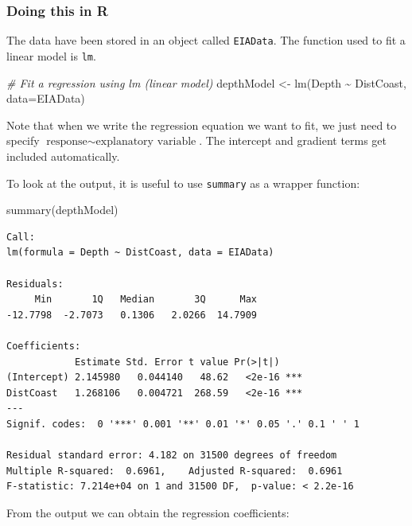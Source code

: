 \documentclass[
  oneside]{krantz}
\newenvironment{Shaded}{\begin{snugshade}}{\end{snugshade}}
\newcommand{\AttributeTok}[1]{\textcolor[rgb]{0.77,0.63,0.00}{#1}}
\newcommand{\CommentTok}[1]{\textcolor[rgb]{0.56,0.35,0.01}{\textit{#1}}}
\newcommand{\FunctionTok}[1]{\textcolor[rgb]{0.00,0.00,0.00}{#1}}
\newcommand{\NormalTok}[1]{#1}
\newcommand{\OtherTok}[1]{\textcolor[rgb]{0.56,0.35,0.01}{#1}}
\newcommand{\SpecialCharTok}[1]{\textcolor[rgb]{0.00,0.00,0.00}{#1}}
\begin{document}
\hypertarget{doing-this-in-r-24}{%
\subsubsection{Doing this in R}\label{doing-this-in-r-24}}

The data have been stored in an object called \texttt{EIAData}. The function used to fit a linear model is \texttt{lm}.

\begin{Shaded}
\begin{Highlighting}[]
\CommentTok{\# Fit a regression using lm (linear model)}
\NormalTok{depthModel }\OtherTok{\textless{}{-}} \FunctionTok{lm}\NormalTok{(Depth }\SpecialCharTok{\textasciitilde{}}\NormalTok{ DistCoast,  }\AttributeTok{data=}\NormalTok{EIAData)}
\end{Highlighting}
\end{Shaded}

Note that when we write the regression equation we want to fit, we just need to specify \(\textrm{response} \sim \textrm{explanatory variable}\). The intercept and gradient terms get included automatically.

To look at the output, it is useful to use \texttt{summary} as a wrapper function:

\begin{Shaded}
\begin{Highlighting}[]
\FunctionTok{summary}\NormalTok{(depthModel)}
\end{Highlighting}
\end{Shaded}

\begin{verbatim}
Call:
lm(formula = Depth ~ DistCoast, data = EIAData)

Residuals:
     Min       1Q   Median       3Q      Max 
-12.7798  -2.7073   0.1306   2.0266  14.7909 

Coefficients:
            Estimate Std. Error t value Pr(>|t|)    
(Intercept) 2.145980   0.044140   48.62   <2e-16 ***
DistCoast   1.268106   0.004721  268.59   <2e-16 ***
---
Signif. codes:  0 '***' 0.001 '**' 0.01 '*' 0.05 '.' 0.1 ' ' 1

Residual standard error: 4.182 on 31500 degrees of freedom
Multiple R-squared:  0.6961,    Adjusted R-squared:  0.6961 
F-statistic: 7.214e+04 on 1 and 31500 DF,  p-value: < 2.2e-16
\end{verbatim}

From the output we can obtain the regression coefficients:
\end{document}
